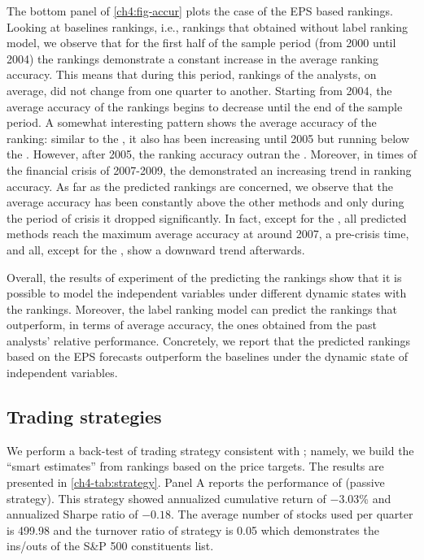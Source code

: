 \documentclass[a4paper,12pt,openright,notitlepage]{report}\usepackage[]{graphicx}\usepackage[]{color}
\begin{document}
The bottom panel of \ref{ch4:fig-accur} plots the case of the EPS based rankings. Looking at baselines rankings, i.e., rankings that obtained without label ranking model, we observe that for the first half of the sample period (from 2000 until 2004) the \naive{} rankings  demonstrate a constant increase in the average ranking accuracy. This means that during this period, rankings of the analysts, on average, did not change from one quarter to another. Starting from 2004, the average accuracy of the \naive{} rankings begins to decrease until the end of the sample period. A somewhat interesting pattern shows the average accuracy of the  ranking: similar to the \naive{}, it also has been increasing until 2005 but running below the \naive{}. However, after 2005, the  ranking accuracy outran the \naive{}. Moreover, in times of the financial crisis of 2007-2009, the  demonstrated an increasing trend in ranking accuracy. As far as the predicted rankings are concerned, we observe that the \diff{} average accuracy has been constantly above the other methods and only during the period of crisis it dropped significantly. In fact, except for the \random{}, all predicted methods reach the maximum average accuracy at around 2007, a pre-crisis time, and all, except for the , show a downward trend afterwards.

Overall, the results of experiment of the predicting the rankings show that it is possible to model the independent variables under different dynamic states with the rankings. Moreover, the label ranking model can predict the rankings that outperform, in terms of average accuracy, the ones  obtained from the past analysts' relative performance. Concretely, we report that the predicted rankings based on the EPS forecasts outperform the baselines under the \diff{} dynamic state of independent variables.




\subsection{Trading strategies}

We perform  a back-test of  trading  strategy consistent with  \cite{aiguzhinov2015a}; namely, we build the ``smart estimates'' from rankings based on the  price targets. The results are presented in \ref{ch4-tab:strategy}. Panel A reports the performance of \Market{} (passive strategy). This strategy showed annualized cumulative return of \ensuremath{-3.03}\% and annualized Sharpe ratio of \ensuremath{-0.18}. The average number of stocks used per quarter is 499.98 and the turnover ratio of strategy is 0.05 which demonstrates the ins/outs of the S\&P 500 constituents list.
\end{document}
